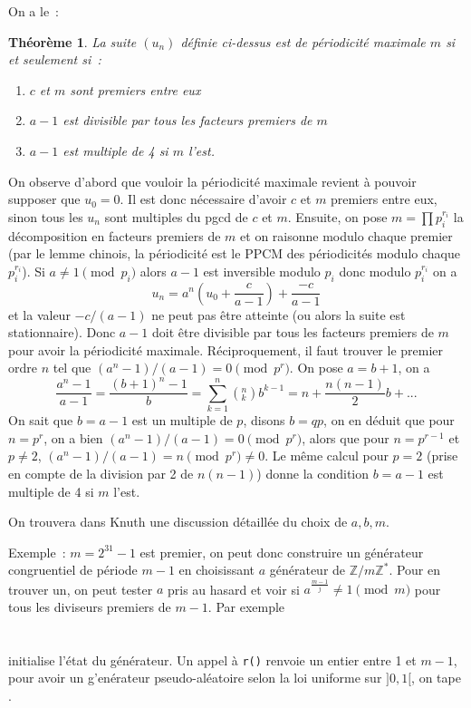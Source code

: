 \documentclass[a4paper,11pt]{book}
\newtheorem{thm}{Théorème}
\begin{document}
\begin{giacjshere}
On a le~:
\begin{thm}
La suite $(u_n)$ définie ci-dessus est de périodicité maximale $m$ si
et seulement si~:
\begin{enumerate}
\item $c$ et $m$ sont premiers entre eux
\item $a-1$ est divisible par tous les facteurs premiers de $m$
\item $a-1$ est multiple de 4 si $m$ l'est.
\end{enumerate}
\end{thm}
On observe d'abord que vouloir la périodicité maximale revient
à pouvoir supposer que $u_0=0$. 
Il est donc nécessaire d'avoir $c$
et $m$ premiers entre eux, sinon tous les $u_n$ sont multiples du
pgcd de $c$ et $m$. Ensuite, on pose $m=\prod p_i^{r_i}$ la
décomposition en facteurs premiers de $m$ et on raisonne modulo
chaque premier (par le lemme chinois, la p\'eriodicit\'e
est le PPCM des p\'eriodicit\'es modulo chaque $p_i^{r_i}$). 
Si $a\neq 1 \pmod p_i$
alors $a-1$ est inversible modulo $p_i$ donc modulo 
$p_i^{r_i}$ on a
$$ u_n=a^n (u_0 + \frac{c}{a-1}) + \frac{-c}{a-1}  $$
et la valeur $-c/(a-1)$ ne peut pas \^etre atteinte
(ou alors la suite est stationnaire).
Donc $a-1$ doit \^etre divisible par tous les facteurs premiers de $m$
pour avoir la p\'eriodicit\'e maximale.
R\'eciproquement, il faut trouver le premier ordre $n$ tel que
$(a^n-1)/(a-1)=0 \pmod{p^r}$. On pose $a=b+1$, on a
$$ \frac{a^n-1}{a-1}=\frac{(b+1)^n-1}{b} = \sum_{k=1}^n
\left(^n_k\right) b^{k-1} = n +\frac{n(n-1)}{2}b +... $$
On sait que $b=a-1$ est un multiple de $p$, disons $b=qp$, on en d\'eduit que
pour $n=p^r$, on a bien $(a^n-1)/(a-1)=0 \pmod{p^r}$, alors que
pour $n=p^{r-1}$ et $p\neq 2$, $(a^n-1)/(a-1)=n \pmod{p^r} \neq 0$.
Le m\^eme calcul pour $p=2$ (prise en compte de la division par 2 de
$n(n-1)$) donne la condition $b=a-1$ est multiple de 4 si $m$ l'est.

On trouvera dans Knuth une discussion détaillée du choix de $a, b, m$.


Exemple~: $m=2^{31}-1$ est premier, on peut donc construire un
g\'en\'erateur congruentiel de p\'eriode $m-1$ en choisissant $a$
g\'en\'erateur de $\mathbb{Z}/m\mathbb{Z}^*$. Pour en trouver un, on peut tester
$a$ pris au hasard et voir si $a^{\frac{m-1}{j}} \neq 1 \pmod m$
pour tous les diviseurs premiers de $m-1$. Par exemple\\
\\
\\
 initialise l'\'etat du g\'en\'erateur.
Un appel \`a \verb|r()| renvoie un entier entre 1 et $m-1$, pour avoir
un g'en\'erateur pseudo-al\'eatoire selon la loi uniforme sur $]0,1[$, on tape
.


\end{giacjshere}
\end{document}
